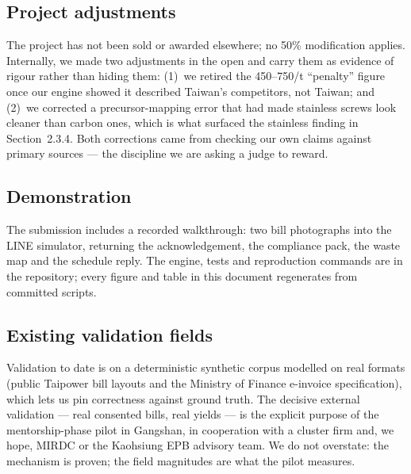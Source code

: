 \documentclass[11pt]{article}
\newcommand{\euro}{\texteuro}
\begin{document}
\subsection{Project adjustments}
The project has not been sold or awarded elsewhere; no 50\% modification applies. Internally, we made two adjustments in the open and carry them as evidence of rigour rather than hiding them: (1)~we retired the \euro{}450--750/t ``penalty'' figure once our engine showed it described Taiwan's competitors, not Taiwan; and (2)~we corrected a precursor-mapping error that had made stainless screws look cleaner than carbon ones, which is what surfaced the stainless finding in Section~2.3.4. Both corrections came from checking our own claims against primary sources --- the discipline we are asking a judge to reward.

\subsection{Demonstration}
The submission includes a recorded walkthrough: two bill photographs into the LINE simulator, returning the acknowledgement, the compliance pack, the waste map and the schedule reply. The engine, tests and reproduction commands are in the repository; every figure and table in this document regenerates from committed scripts.

\subsection{Existing validation fields}
Validation to date is on a deterministic synthetic corpus modelled on real formats (public Taipower bill layouts and the Ministry of Finance e-invoice specification), which lets us pin correctness against ground truth. The decisive external validation --- real consented bills, real yields --- is the explicit purpose of the mentorship-phase pilot in Gangshan, in cooperation with a cluster firm and, we hope, MIRDC or the Kaohsiung EPB advisory team. We do not overstate: the mechanism is proven; the field magnitudes are what the pilot measures.
\end{document}
